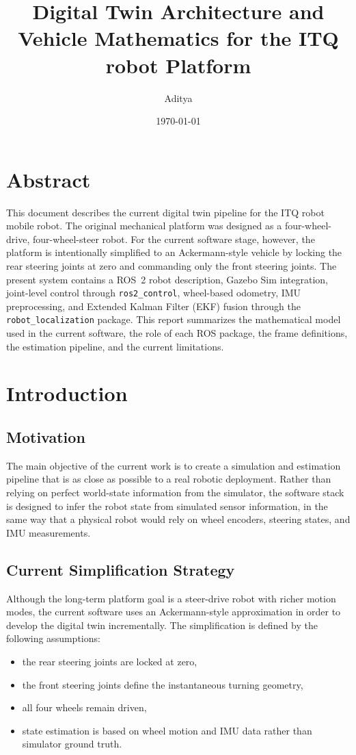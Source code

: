 \documentclass[12pt,a4paper]{report}
\title{Digital Twin Architecture and Vehicle Mathematics for the ITQ robot Platform}
\author{Aditya}
\date{\today}
\begin{document}
\maketitle
\tableofcontents
\clearpage

\chapter*{Abstract}
This document describes the current digital twin pipeline for the ITQ robot mobile robot. The original mechanical platform was designed as a four-wheel-drive, four-wheel-steer robot. For the current software stage, however, the platform is intentionally simplified to an Ackermann-style vehicle by locking the rear steering joints at zero and commanding only the front steering joints. The present system contains a ROS~2 robot description, Gazebo Sim integration, joint-level control through \texttt{ros2\_control}, wheel-based odometry, IMU preprocessing, and Extended Kalman Filter (EKF) fusion through the \texttt{robot\_localization} package. This report summarizes the mathematical model used in the current software, the role of each ROS package, the frame definitions, the estimation pipeline, and the current limitations.

\chapter{Introduction}

\section{Motivation}
The main objective of the current work is to create a simulation and estimation pipeline that is as close as possible to a real robotic deployment. Rather than relying on perfect world-state information from the simulator, the software stack is designed to infer the robot state from simulated sensor information, in the same way that a physical robot would rely on wheel encoders, steering states, and IMU measurements.

\section{Current Simplification Strategy}
Although the long-term platform goal is a steer-drive robot with richer motion modes, the current software uses an Ackermann-style approximation in order to develop the digital twin incrementally. The simplification is defined by the following assumptions:
\begin{itemize}[leftmargin=*]
  \item the rear steering joints are locked at zero,
  \item the front steering joints define the instantaneous turning geometry,
  \item all four wheels remain driven,
  \item state estimation is based on wheel motion and IMU data rather than simulator ground truth.
\end{itemize}
\end{document}
